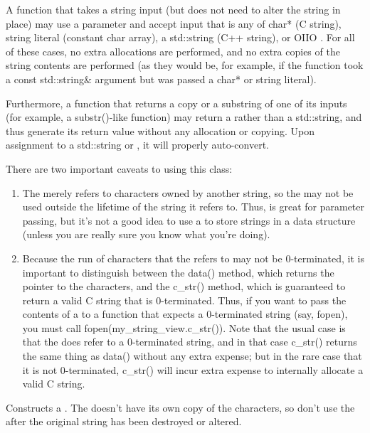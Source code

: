 A function that takes a string input (but does not need to alter the string
in place) may use a \stringview parameter and accept input that is any of
{\cf char*} (C string), string literal (constant char array), a {\cf
std::string} (C++ string), or OIIO \ustring.  For all of these cases, no
extra allocations are performed, and no extra copies of the string  contents
are performed (as they would be, for example, if the function took a const
{\cf std::string\&} argument but was passed a {\cf char*} or string
literal).

Furthermore, a function that returns a copy or a substring of one of its
inputs (for example, a {\cf substr()}-like function) may return a \stringview
rather than a {\cf std::string}, and thus generate its return value without
any allocation or copying. Upon assignment to a {\cf std::string} or \ustring,
it will properly auto-convert.

There are two important caveats to using this class:
\begin{enumerate}
\item The \stringview merely refers to characters owned by another string,
   so the \stringview may not be used outside the lifetime of the string
   it refers to. Thus, \stringview is great for parameter passing, but
   it's not a good idea to use a \stringview to store strings in a data
   structure (unless you are really sure you know what you're doing).
\item Because the run of characters that the \stringview refers to may not
   be 0-terminated, it is important to distinguish between the {\cf data()}
   method, which returns the pointer to the characters, and the {\cf c_str()}
   method, which is guaranteed to return a valid C string that is
   0-terminated. Thus, if you want to pass the contents of a \stringview
   to a function that expects a 0-terminated string (say, fopen), you
   must call {\cf fopen(my_string_view.c_str()}).  Note that the usual case
   is that the \stringview does refer to a 0-terminated string, and in
   that case c_str() returns the same thing as data() without any extra
   expense; but in the rare case that it is not 0-terminated, c_str()
   will incur extra expense to internally allocate a valid C string.
\end{enumerate}

Constructs a \stringview.  The \stringview doesn't have its own copy of the
characters, so don't use the \stringview after the original string has been
destroyed or altered.

